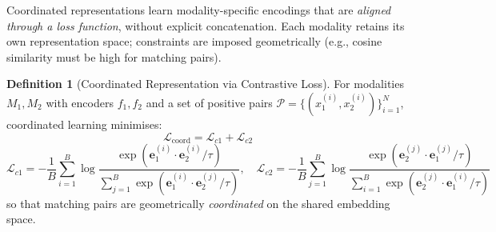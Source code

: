 \documentclass[12pt,a4paper]{article}
\theoremstyle{definition}
\newtheorem{definition}{Definition}[section]
\theoremstyle{plain}
\theoremstyle{remark}
\begin{document}
Coordinated representations learn modality-specific encodings that are \emph{aligned through a loss function}, without explicit concatenation. Each modality retains its own representation space; constraints are imposed geometrically (e.g., cosine similarity must be high for matching pairs).

\begin{definition}[Coordinated Representation via Contrastive Loss]
For modalities $M_1, M_2$ with encoders $f_1, f_2$ and a set of positive pairs $\mathcal{P} = \{(x_1^{(i)}, x_2^{(i)})\}_{i=1}^N$, coordinated learning minimises:
\[
  \mathcal{L}_{\text{coord}} = \mathcal{L}_{c1} + \mathcal{L}_{c2}
\]
\[
  \mathcal{L}_{c1} = -\frac{1}{B}\sum_{i=1}^B \log\frac{\exp(\mathbf{e}_1^{(i)} \cdot \mathbf{e}_2^{(i)} / \tau)}{\sum_{j=1}^B \exp(\mathbf{e}_1^{(i)} \cdot \mathbf{e}_2^{(j)} / \tau)}, \quad \mathcal{L}_{c2} = -\frac{1}{B}\sum_{j=1}^B \log\frac{\exp(\mathbf{e}_2^{(j)} \cdot \mathbf{e}_1^{(j)} / \tau)}{\sum_{i=1}^B \exp(\mathbf{e}_2^{(j)} \cdot \mathbf{e}_1^{(i)} / \tau)}
\]
so that matching pairs are geometrically \emph{coordinated} on the shared embedding space.
\end{definition}
\end{document}
